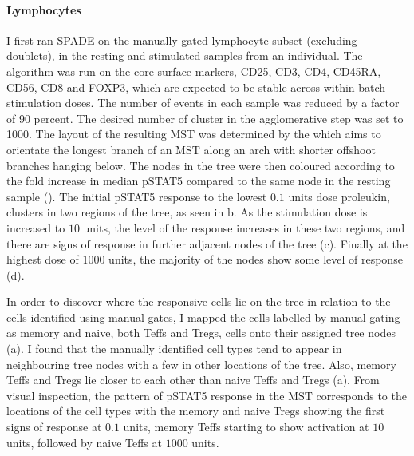 \paragraph{Lymphocytes}

I first ran \gls{SPADE} on the manually gated lymphocyte subset (excluding doublets),
in the resting and stimulated samples from an individual.
The algorithm was run on the core surface markers, CD25, CD3, CD4, CD45RA, CD56, CD8 and FOXP3,
which are expected to be stable across within-batch stimulation doses.
The number of events in each sample was reduced by a factor of 90 percent.
The desired number of cluster in the agglomerative step was set to 1000.
The layout of the resulting \gls{MST} was determined by the 
which aims to orientate the longest branch of an \gls{MST} along an arch with shorter offshoot branches hanging below.
The nodes in the tree were then coloured according to the fold increase in median pSTAT5 compared to the same node
in the resting sample ().
The initial pSTAT5 response to the lowest $0.1$ units dose proleukin, clusters in two regions of the tree,
as seen in b.
As the stimulation dose is increased to $10$ units, the level of the response increases in these two regions,
and there are signs of response in further adjacent nodes of the tree (c).
Finally at the highest dose of $1000$ units, the majority of the nodes show some level of response (d).

In order to discover where the responsive cells lie on the tree in relation to the cells identified using manual gates, I mapped the cells labelled by manual gating as memory and naive, both Teffs and Tregs, cells onto their assigned tree nodes (a).
I found that the manually identified cell types tend to appear in neighbouring tree nodes with a few in other locations of the tree.
Also, memory Teffs and Tregs lie closer to each other than naive Teffs and Tregs (a).
From visual inspection, the pattern of pSTAT5 response in the \gls{MST} corresponds to the locations of the cell types
with the memory and naive Tregs showing the first signs of response at $0.1$ units, memory Teffs starting to show activation at $10$ units,
followed by naive Teffs at $1000$ units.

